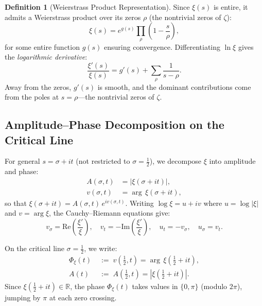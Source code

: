 \documentclass[11pt, a4paper]{article}
\theoremstyle{definition}
\newtheorem{definition}{Definition}[section]
\theoremstyle{plain}
\newcommand{\xif}{\xi}                      %
\newcommand{\Phiz}{\Phi_\xi}               %
\newcommand{\Ampl}{A}                       %
\begin{document}
\begin{definition}[Weierstrass Product Representation]
\label{def:weierstrass}
Since $\xif(s)$ is entire, it admits a Weierstrass product over its zeros
$\rho$ (the nontrivial zeros of $\zeta$):
\begin{equation}
  \xif(s) = e^{g(s)}\prod_{\rho}
  \left(1 - \frac{s}{\rho}\right),
  \label{eq:weierstrass}
\end{equation}
for some entire function $g(s)$ ensuring convergence. Differentiating
$\ln\xif$ gives the \textit{logarithmic derivative}:
\begin{equation}
  \frac{\xif'(s)}{\xif(s)} = g'(s) + \sum_{\rho}
  \frac{1}{s - \rho}.
  \label{eq:log_deriv}
\end{equation}
Away from the zeros, $g'(s)$ is smooth, and the dominant contributions
come from the poles at $s = \rho$---the nontrivial zeros of $\zeta$.
\end{definition}


\subsection{Amplitude--Phase Decomposition on the Critical Line}
\label{sec:amp_phase}

For general $s = \sigma + it$ (not restricted to $\sigma = \tfrac{1}{2}$),
we decompose $\xif$ into amplitude and phase:
\begin{align}
  \Ampl(\sigma, t) &= |\xif(\sigma + it)|,
  \label{eq:amplitude}\\
  v(\sigma, t) &= \arg\,\xif(\sigma + it),
  \label{eq:phase_general}
\end{align}
so that $\xif(\sigma + it) = \Ampl(\sigma,t)\,e^{iv(\sigma,t)}$.
Writing $\log\xif = u + iv$ where $u = \log|\xif|$ and
$v = \arg\xif$, the Cauchy--Riemann equations give:
\begin{equation}
  v_\sigma = \mathrm{Re}\!\left(\frac{\xif'}{\xif}\right), \quad
  v_t = -\mathrm{Im}\!\left(\frac{\xif'}{\xif}\right), \quad
  u_t = -v_\sigma, \quad u_\sigma = v_t.
  \label{eq:cauchy_riemann}
\end{equation}

On the critical line $\sigma = \tfrac{1}{2}$, we write:
\begin{align}
  \Phiz(t) &\;:=\; v(\tfrac{1}{2}, t) = \arg\,\xif(\tfrac{1}{2}+it),
  \label{eq:phase_crit}\\
  \Ampl(t) &\;:=\; \Ampl(\tfrac{1}{2}, t) = |\xif(\tfrac{1}{2}+it)|.
  \label{eq:amp_crit}
\end{align}
Since $\xif(\tfrac{1}{2}+it) \in \mathbb{R}$, the phase $\Phiz(t)$
takes values in $\{0, \pi\}$ (modulo $2\pi$), jumping by $\pi$ at each
zero crossing.
\end{document}
